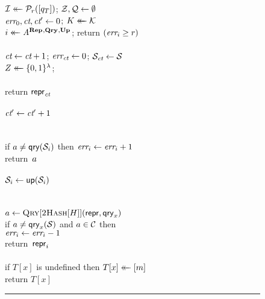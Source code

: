 \begin{figure}
  {
    \vspace{-7.5pt}
                  \hfill{}\;\\[2pt]
      $\mathcal{I} \mathrel{\leftarrow\mkern-14mu\leftarrow} \mathcal{P}_r([q_T])$;
      $\mathcal{Z}, \mathcal{Q} \gets \emptyset$\\
      $\textit{err}_0, \textit{ct}, \textit{ct}' \gets 0$;
      $K \mathrel{\leftarrow\mkern-14mu\leftarrow} \mathcal{K}$\\
      $i \mathrel{\leftarrow\mkern-14mu\leftarrow} \mathit{A}^{\mathbf{Rep}\hspace{0.5pt},\mathbf{Qry}\hspace{0.5pt},\mathbf{Up}\hspace{0.5pt}}$;
      return $(\textit{err}_i \ge r)$
    \\[6pt]
    \oraclev{$\REPO(\col)$}\\[2pt]
      $\textit{ct} \gets \textit{ct} + 1$; $\textit{err}_{\textit{ct}} \gets 0$;
      $\mathcal{S}_{\textit{ct}} \gets \mathcal{S}$\\
      $Z \mathrel{\leftarrow\mkern-14mu\leftarrow} \{0,1\}^\lambda$;
      \diffminus{$\pub_\ct \gets \Repx[F_\ky](\col, \salt)$}\\
      \diffplus{$\pub_\ct \gets \Repx[\Rnd](\col, \salt)$}\\
      return $\mathsf{repr}_{\textit{ct}}$
    \\[6pt]
    \\[2pt]
      $\textit{ct}' \gets \textit{ct}' + 1$\\
      \\
      \\
      if $a \neq \mathsf{qry}(\mathcal{S}_i)$ then $\textit{err}_i\gets\textit{err}_i+1$\\
      return~$a$
    \\[6pt]
    \\[2pt]
      $\mathcal{S}_i \gets \mathsf{up}(\mathcal{S}_i)$\\
      \\
      \\
      $a \gets \textsc{Qry}[\textsc{2Hash}[H]](\mathsf{repr}, \mathsf{qry}_x)$\\
      if $a \neq \mathsf{qry}_x(\mathcal{S})$ and $a \in \mathcal{C}$ then\\
      \tab $\textit{err}_i \gets \textit{err}_i-1$\\
      return~$\mathsf{repr}_i$
    \\[6pt]
    \\[2pt]
      if $T[x]$ is undefined then $T[x] \mathrel{\leftarrow\mkern-14mu\leftarrow} [m]$\\
      return $T[x]$
    \\
    \hspace*{-4pt}\rule{1.049\textwidth}{.4pt}
}
\end{figure}
